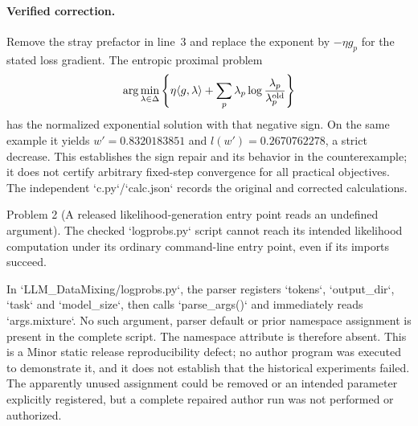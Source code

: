 \documentclass[10pt]{article}
\begin{document}
\paragraph*{Verified correction.}\mbox{}\par
Remove the stray prefactor in line 3 and replace the exponent by \(-\eta g_p\) for the stated loss gradient. The entropic proximal problem \[\arg\min_{\lambda\in\Delta}
 \left\{\eta\langle g,\lambda\rangle+
       \sum_p\lambda_p\log\frac{\lambda_p}{\lambda_p^{\rm old}}\right\}\] has the normalized exponential solution with that negative sign. On the same example it yields \(w'=0.8320183851\) and \(l(w')=0.2670762278\), a strict decrease. This establishes the sign repair and its behavior in the counterexample; it does not certify arbitrary fixed-step convergence for all practical objectives. The independent `c.py`/`calc.json` records the original and corrected calculations.\par
Problem 2 (A released likelihood-generation entry point reads an undefined argument).  The checked `logprobs.py` script cannot reach its intended likelihood computation under its ordinary command-line entry point, even if its imports succeed.\par
In `LLM\_DataMixing/logprobs.py`, the parser registers `tokens`, `output\_dir`, `task` and `model\_size`, then calls `parse\_args()` and immediately reads `args.mixture`. No such argument, parser default or prior namespace assignment is present in the complete script. The namespace attribute is therefore absent. This is a Minor static release reproducibility defect; no author program was executed to demonstrate it, and it does not establish that the historical experiments failed. The apparently unused assignment could be removed or an intended parameter explicitly registered, but a complete repaired author run was not performed or authorized.\par
\end{document}
